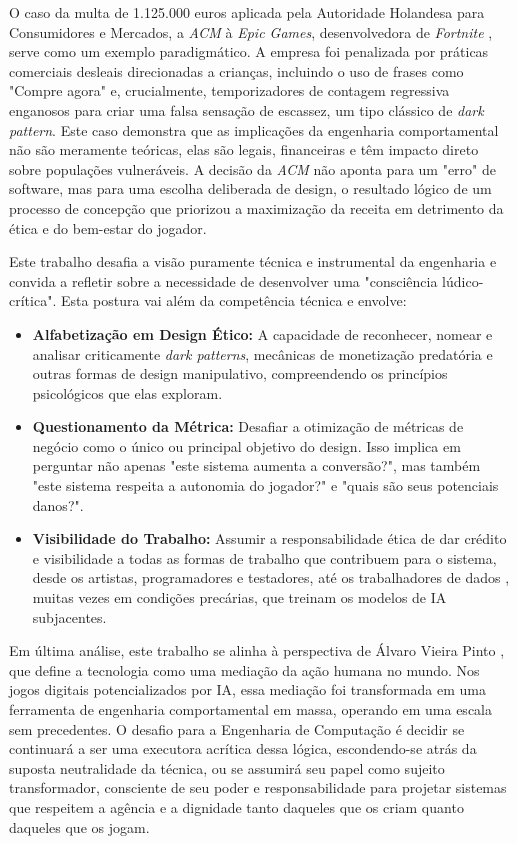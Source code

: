 O caso da multa de 1.125.000 euros aplicada pela Autoridade Holandesa para Consumidores e Mercados, a \textit{ACM} à 
\textit{Epic Games}, desenvolvedora de \textit{Fortnite} \cite{ACM2024EpicGames}, serve como um exemplo paradigmático. A empresa foi penalizada por práticas 
comerciais desleais direcionadas a crianças, incluindo o uso de frases como "Compre agora" e, crucialmente, temporizadores de contagem 
regressiva enganosos para criar uma falsa sensação de escassez, um tipo clássico de \textit{dark pattern}. Este caso demonstra que as 
implicações da engenharia comportamental não são meramente teóricas, elas são legais, financeiras e têm impacto direto sobre 
populações vulneráveis. A decisão da \textit{ACM} não aponta para um "erro" de software, mas para uma escolha deliberada de design, 
o resultado lógico de um processo de concepção que priorizou a maximização da receita em detrimento da ética e do bem-estar do jogador. 

Este trabalho desafia a visão puramente técnica e instrumental da engenharia e convida a refletir sobre a necessidade de desenvolver uma 
"consciência lúdico-crítica". Esta postura vai além da competência técnica e envolve:

\begin{itemize}
    \item \textbf{Alfabetização em Design Ético:} A capacidade de reconhecer, nomear e analisar criticamente \textit{dark patterns}, \cite{LeiserSantos2024}
    mecânicas de monetização predatória e outras formas de design manipulativo, compreendendo os princípios psicológicos que elas 
    exploram.
    
    \item \textbf{Questionamento da Métrica:} Desafiar a otimização de métricas de negócio como o único ou principal objetivo do design. 
    Isso implica em perguntar não apenas "este sistema aumenta a conversão?", mas também "este sistema respeita a autonomia do jogador?" e 
    "quais são seus potenciais danos?".
    
    \item \textbf{Visibilidade do Trabalho:} Assumir a responsabilidade ética de dar crédito e visibilidade a todas as formas de 
    trabalho que contribuem para o sistema, desde os artistas, programadores e testadores, até os trabalhadores de dados \cite{GraySuri2019}, muitas 
    vezes em condições precárias, que treinam os modelos de IA subjacentes. 
\end{itemize}

Em última análise, este trabalho se alinha à perspectiva de Álvaro Vieira Pinto \cite{VieiraPinto2005}, que define a tecnologia como uma mediação da ação 
humana no mundo. Nos jogos digitais potencializados por IA, essa mediação foi transformada em uma ferramenta de engenharia 
comportamental em massa, operando em uma escala sem precedentes. O desafio para a Engenharia de Computação é decidir se continuará a 
ser uma executora acrítica dessa lógica, escondendo-se atrás da suposta neutralidade da técnica, ou se assumirá seu papel como 
sujeito transformador, consciente de seu poder e responsabilidade para projetar sistemas que respeitem a agência e a dignidade tanto 
daqueles que os criam quanto daqueles que os jogam. 

